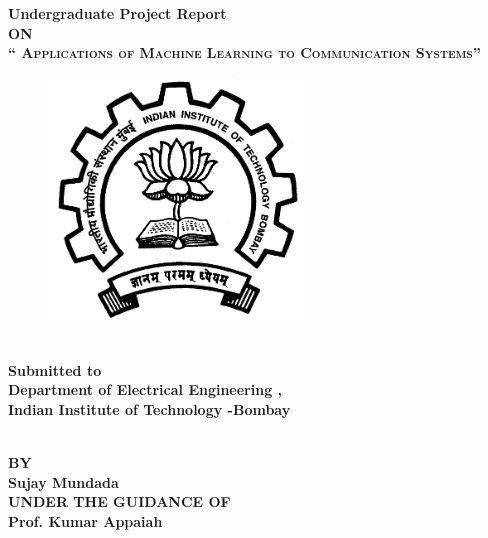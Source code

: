 \newpage
\begin{center}
\thispagestyle{empty}
\Large{\textbf{Undergraduate Project Report\\ \large{ON}}}\\[0.7cm]
\LARGE{\textsc {\textbf{`` Applications of Machine Learning to Communication Systems''}}}\\[0.5cm]
\vspace{0.5cm}

\begin{figure}[H]
  \centering
    \includegraphics[height= 6.5cm, width=6.5
    cm]{project/images/IITBombay}
\end{figure}

\Large{\textbf{\\Submitted to}}
\LARGE{\textbf{\\Department of Electrical Engineering ,\\ Indian Institute of Technology -Bombay\\}}

\Large{\textbf{\\BY}}\\[0.5cm]
\Large{\textbf{Sujay Mundada}}\\[0.5cm]

\vspace{0.5cm}
\large{\textbf{UNDER THE GUIDANCE OF}}\\
\large{\textbf{Prof. Kumar Appaiah}}\\
\vspace{1cm}

\vspace{1cm}


\newpage
\end{center}
